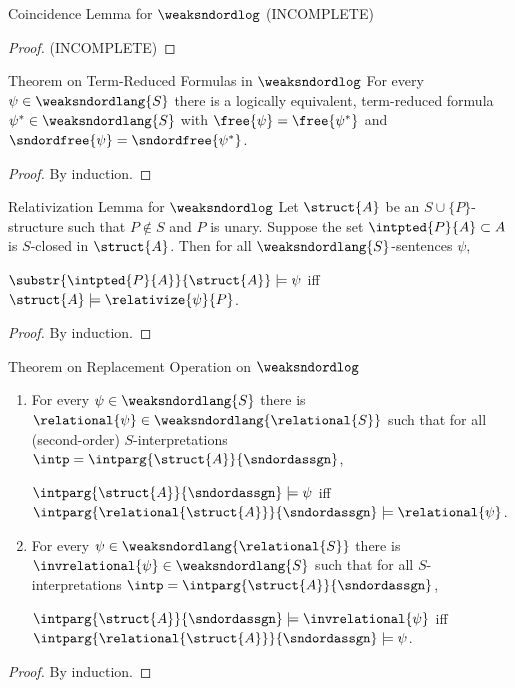 \begin{enumerate}[1.]
\begin{theorem}{Coincidence Lemma for $\weaksndordlog$}
(INCOMPLETE)
\end{theorem}
\begin{proof}
(INCOMPLETE)
\end{proof}
\begin{theorem}{Theorem on Term-Reduced Formulas in $\weaksndordlog$}
For every $\psi \in \weaksndordlang{S}$ there is a logically equivalent, term-reduced formula $\psi^\ast \in \weaksndordlang{S}$ with $\free{\psi} = \free{\psi^\ast}$ and $\sndordfree{\psi} = \sndordfree{\psi^\ast}$.
\end{theorem}
\begin{proof}
By induction.
\end{proof}
\begin{theorem}{Relativization Lemma for $\weaksndordlog$}
Let $\struct{A}$ be an $S \cup \{ P \}$-structure such that $P \not\in S$ and $P$ is unary. Suppose the set $\intpted{P}{A} \subset A$ is $S$-closed in $\struct{A}$. Then for all $\weaksndordlang{S}$-sentences $\psi$,\smallskip\\
\centerline{$\substr{{\intpted{P}{A}}}{\struct{A}} \models \psi$ \quad iff \quad $\struct{A} \models \relativize{\psi}{P}$.}
\end{theorem}
\begin{proof}
By induction.
\end{proof}
\begin{theorem}{Theorem on Replacement Operation on $\weaksndordlog$}
\begin{enumerate}[\rm(a)]
\item For every $\psi \in \weaksndordlang{S}$ there is $\relational{\psi} \in \weaksndordlang{\relational{S}}$ such that for all (second-order) $S$-interpretations $\intp = \intparg{\struct{A}}{\sndordassgn}$,\\
\centerline{$\intparg{\struct{A}}{\sndordassgn} \models \psi$ \quad iff \quad $\intparg{\relational{\struct{A}}}{\sndordassgn} \models \relational{\psi}$.}
\item For every $\psi \in \weaksndordlang{{\relational{S}}}$ there is $\invrelational{\psi} \in \weaksndordlang{S}$ such that for all $S$-interpretations $\intp = \intparg{\struct{A}}{\sndordassgn}$,\\
\centerline{$\intparg{\struct{A}}{\sndordassgn} \models \invrelational{\psi}$ \quad iff \quad $\intparg{\relational{\struct{A}}}{\sndordassgn} \models \psi$.}
\end{enumerate}
\end{theorem}
\begin{proof}
By induction.
\end{proof}

\end{enumerate}
